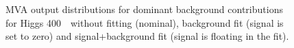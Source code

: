 \begin{figure}[!hbtp]
\caption{
MVA output distributions for dominant background contributions for
Higgs 400~\GeV\ without fitting (nominal), background fit (signal is
set to zero) and signal+background fit (signal is floating in the
fit).}
\label{fig:bdt2_400}
\end{figure}


